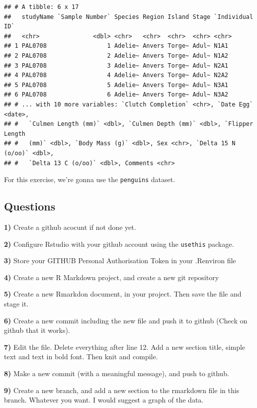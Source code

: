 \documentclass[
  12pt,
]{book}
\begin{document}
\begin{verbatim}
## # A tibble: 6 x 17
##   studyName `Sample Number` Species Region Island Stage `Individual ID`
##   <chr>               <dbl> <chr>   <chr>  <chr>  <chr> <chr>          
## 1 PAL0708                 1 Adelie~ Anvers Torge~ Adul~ N1A1           
## 2 PAL0708                 2 Adelie~ Anvers Torge~ Adul~ N1A2           
## 3 PAL0708                 3 Adelie~ Anvers Torge~ Adul~ N2A1           
## 4 PAL0708                 4 Adelie~ Anvers Torge~ Adul~ N2A2           
## 5 PAL0708                 5 Adelie~ Anvers Torge~ Adul~ N3A1           
## 6 PAL0708                 6 Adelie~ Anvers Torge~ Adul~ N3A2           
## # ... with 10 more variables: `Clutch Completion` <chr>, `Date Egg` <date>,
## #   `Culmen Length (mm)` <dbl>, `Culmen Depth (mm)` <dbl>, `Flipper Length
## #   (mm)` <dbl>, `Body Mass (g)` <dbl>, Sex <chr>, `Delta 15 N (o/oo)` <dbl>,
## #   `Delta 13 C (o/oo)` <dbl>, Comments <chr>
\end{verbatim}

For this exercise, we're gonna use the \texttt{penguins} dataset.

\hypertarget{questions-1}{%
\subsection{Questions}\label{questions-1}}

\textbf{1)} Create a github acocunt if not done yet.

\textbf{2)} Configure Rstudio with your github account using the \texttt{usethis} package.

\textbf{3)} Store your GITHUB Personal Authorisation Token in your .Renviron file

\textbf{4)} Create a new R Markdown project, and create a new git repository

\textbf{5)} Create a new Rmarkdon document, in your project. Then save the file and stage it.

\textbf{6)} Create a new commit including the new file and push it to github (Check on github that it works).

\textbf{7)} Edit the file. Delete everything after line 12. Add a new section title, simple text and text in bold font. Then knit and compile.

\textbf{8)} Make a new commit (with a meaningful message), and push to github.

\textbf{9)} Create a new branch, and add a new section to the rmarkdown file in this branch. Whatever you want. I would suggest a graph of the data.
\end{document}
